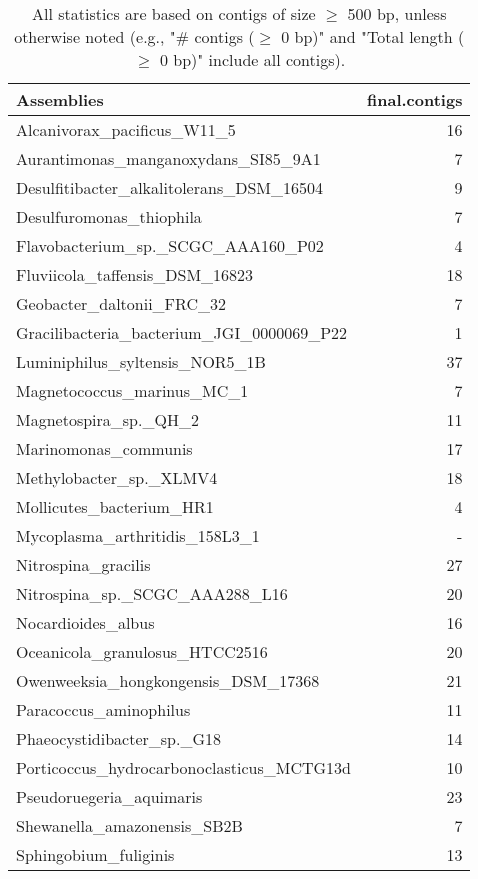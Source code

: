\documentclass[12pt,a4paper]{article}
\begin{document}
\begin{table}[ht]
\begin{center}
\caption{All statistics are based on contigs of size $\geq$ 500 bp, unless otherwise noted (e.g., "\# contigs ($\geq$ 0 bp)" and "Total length ($\geq$ 0 bp)" include all contigs).}
\begin{tabular}{|l*{1}{|r}|}
\hline
Assemblies & final.contigs \\ \hline
Alcanivorax\_pacificus\_W11\_5 & 16 \\ \hline
Aurantimonas\_manganoxydans\_SI85\_9A1 & 7 \\ \hline
Desulfitibacter\_alkalitolerans\_DSM\_16504 & 9 \\ \hline
Desulfuromonas\_thiophila & 7 \\ \hline
Flavobacterium\_sp.\_SCGC\_AAA160\_P02 & 4 \\ \hline
Fluviicola\_taffensis\_DSM\_16823 & 18 \\ \hline
Geobacter\_daltonii\_FRC\_32 & 7 \\ \hline
Gracilibacteria\_bacterium\_JGI\_0000069\_P22 & 1 \\ \hline
Luminiphilus\_syltensis\_NOR5\_1B & 37 \\ \hline
Magnetococcus\_marinus\_MC\_1 & 7 \\ \hline
Magnetospira\_sp.\_QH\_2 & 11 \\ \hline
Marinomonas\_communis & 17 \\ \hline
Methylobacter\_sp.\_XLMV4 & 18 \\ \hline
Mollicutes\_bacterium\_HR1 & 4 \\ \hline
Mycoplasma\_arthritidis\_158L3\_1 & - \\ \hline
Nitrospina\_gracilis & 27 \\ \hline
Nitrospina\_sp.\_SCGC\_AAA288\_L16 & 20 \\ \hline
Nocardioides\_albus & 16 \\ \hline
Oceanicola\_granulosus\_HTCC2516 & 20 \\ \hline
Owenweeksia\_hongkongensis\_DSM\_17368 & 21 \\ \hline
Paracoccus\_aminophilus & 11 \\ \hline
Phaeocystidibacter\_sp.\_G18 & 14 \\ \hline
Porticoccus\_hydrocarbonoclasticus\_MCTG13d & 10 \\ \hline
Pseudoruegeria\_aquimaris & 23 \\ \hline
Shewanella\_amazonensis\_SB2B & 7 \\ \hline
Sphingobium\_fuliginis & 13 \\ \hline

\end{tabular}
\end{center}
\end{table}
\end{document}

